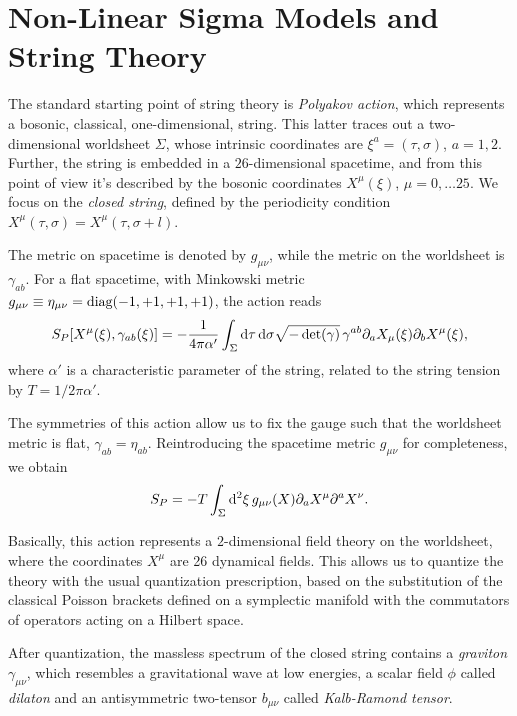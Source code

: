\section{Non-Linear Sigma Models and String Theory}
The standard starting point of string theory is \emph{Polyakov action}, which represents a bosonic, classical, one-dimensional, string. This latter traces out a two-dimensional worldsheet $\Sigma$, whose intrinsic coordinates are $\xi^a = (\tau, \sigma)$, $a = 1,2$. Further, the string is embedded in a $26$-dimensional spacetime, and from this point of view it's described by the bosonic coordinates $X^\mu(\xi)$, $\mu = 0, \dots 25$. We focus on the \emph{closed string}, defined by the periodicity condition $X^\mu(\tau,\sigma) = X^\mu (\tau, \sigma + l)$.

The metric on spacetime is denoted by $g_{\mu\nu}$, while the metric on the worldsheet is $\gamma_{ab}$. For a flat spacetime, with Minkowski metric $g_{\mu\nu} \equiv \eta_{\mu\nu} = \textup{diag}(-1,+1,+1,+1)$, the action reads
\begin{equation}\label{eq:polyakov}
    S_P [X^\mu(\xi), \gamma_{ab}(\xi)] = -\frac{1}{4\pi\alpha'} \int_\Sigma \mathop{}\!\mathrm{d} \tau \mathop{}\!\mathrm{d} \sigma \sqrt{-\det(\gamma)} \, \gamma^{ab} \partial_a X_\mu (\xi) \partial_b X^\mu (\xi),
\end{equation}
where $\alpha'$ is a characteristic parameter of the string, related to the string tension by $T = 1 / 2\pi\alpha'$.

The symmetries of this action allow us to fix the gauge such that the worldsheet metric is flat, $\gamma_{ab} = \eta_{ab}$. Reintroducing the spacetime metric $g_{\mu\nu}$ for completeness, we obtain
\begin{equation}\label{eq:polyakov-metric}
    S_P = - T \int_\Sigma \mathop{}\!\mathrm{d}^2 \xi \, g_{\mu\nu}(X) \partial_a X^\mu \partial^a X^\nu.
\end{equation}

Basically, this action represents a $2$-dimensional field theory on the worldsheet, where the coordinates $X^\mu$ are 26 dynamical fields. This allows us to quantize the theory with the usual quantization prescription, based on the substitution of the classical Poisson brackets defined on a symplectic manifold with the commutators of operators acting on a Hilbert space.

After quantization, the massless spectrum of the closed string contains a \emph{graviton} $\gamma_{\mu\nu}$, which resembles a gravitational wave at low energies, a scalar field $\phi$ called \emph{dilaton} and an antisymmetric two-tensor $b_{\mu\nu}$ called \emph{Kalb-Ramond tensor}.

